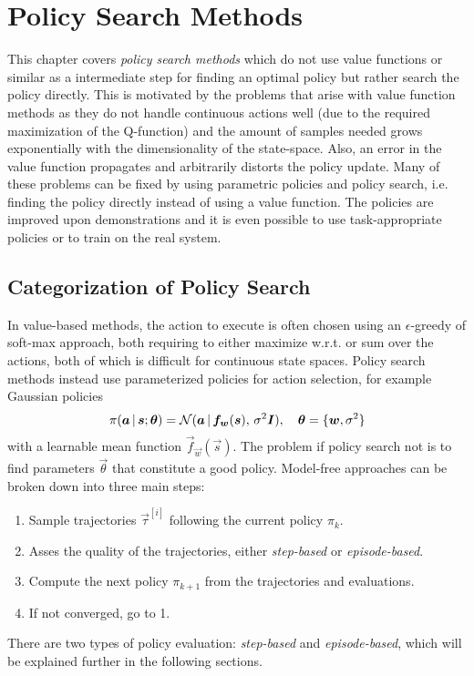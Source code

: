 \chapter{Policy Search Methods}
	\label{c:policySearch}

	This chapter covers \emph{policy search methods} which do not use value functions or similar as a intermediate step for finding an optimal policy but rather search the policy directly. This is motivated by the problems that arise with value function methods as they do not handle continuous actions well (due to the required maximization of the Q-function) and the amount of samples needed grows exponentially with the dimensionality of the state-space. Also, an error in the value function propagates and arbitrarily distorts the policy update. Many of these problems can be fixed by using parametric policies and policy search, i.e. finding the policy directly instead of using a value function. The policies are improved upon demonstrations and it is even possible to use task-appropriate policies or to train on the real system.

	\section{Categorization of Policy Search}
		In value-based methods, the action to execute is often chosen using an \(\epsilon\)-greedy of soft-max approach, both requiring to either maximize w.r.t. or sum over the actions, both of which is difficult for continuous state spaces. Policy search methods instead use parameterized policies for action selection, for example Gaussian policies
		\begin{equation*}
			\pi(\bm{a} \,\vert\, \bm{s}; \bm{\theta}) = \mathcal{N}(\bm{a} \,\vert\, \bm{f}_{\bm{w}}(\bm{s}),\, \sigma^2 \bm{I}),\quad \bm{\theta} = \{ \bm{w}, \sigma^2 \}
		\end{equation*}
		with a learnable mean function \( \vec{f}_{\vec{w}}(\vec{s}) \). The problem if policy search not is to find parameters \( \vec{\theta} \) that constitute a good policy. Model-free approaches can be broken down into three main steps:
		\begin{enumerate}
			\item {} Sample trajectories \( \vec{\tau}^{[i]} \) following the current policy \( \pi_k \).
			\item {} Asses the quality of the trajectories, either \emph{step-based} or \emph{episode-based}.
			\item {} Compute the next policy \( \pi_{k + 1} \) from the trajectories and evaluations.
			\item If not converged, go to 1.
		\end{enumerate}
		There are two types of policy evaluation: \emph{step-based} and \emph{episode-based}, which will be explained further in the following sections.

